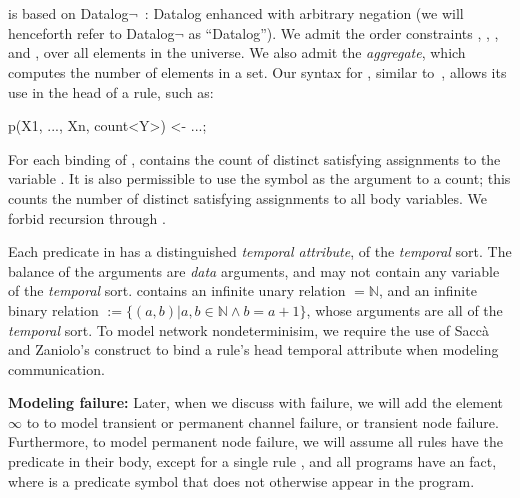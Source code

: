 \section{\large \bf \lang}
\label{sec:slang}


\lang is based on Datalog$\lnot$~\cite{ullmanbook}: Datalog enhanced with arbitrary negation (we will henceforth refer to Datalog$\lnot$ as ``Datalog'').  We admit the order constraints \dedalus{<}, \dedalus{=}, \dedalus{!=}, and \dedalus{<=}, over all elements in the universe.  We also admit the  {\em aggregate}, which computes the number of elements in a set.  Our syntax for , similar to~\cite{datalog-agg}, allows its use in the head of a rule, such as: 

\begin{Dedalus}
p(X1, ..., Xn, count<Y>) <- ...;
\end{Dedalus}

For each binding of ,  contains the count of distinct satisfying assignments to the variable .  It is also permissible to use the symbol \dedalus{*} as the argument to a count; this counts the number of distinct satisfying assignments to all body variables.
We forbid recursion through .

Each predicate in \lang has a distinguished {\em temporal attribute}, of the {\em temporal} sort.  The balance of the arguments are {\em data} arguments, and may not contain any variable of the {\em temporal} sort.  \lang contains an infinite unary relation  $= \mathbb{N}$, and an infinite binary relation  $:= \{(a,b) | a,b \in \mathbb{N} \land b = a + 1\}$, whose arguments are all of the {\em temporal} sort.  To model network nondeterminisim, we require the use of Sacc\`{a} and Zaniolo's  construct to bind a rule's head temporal attribute when modeling communication.

{\bf Modeling failure:}  Later, when we discuss \lang with failure, we will add the element $\infty$ to  to model transient or permanent channel failure, or transient node failure.  Furthermore, to model permanent node failure, we will assume all rules have the  predicate in their body, except for a single rule , and all programs have an  fact, where  is a predicate symbol that does not otherwise appear in the program.    

